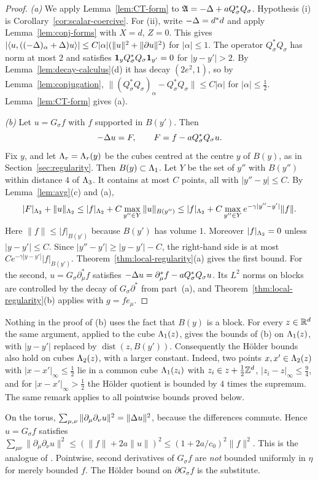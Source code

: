 \begin{proof}
\emph{(a)} We apply Lemma~\ref{lem:CT-form} to $\mathfrak A=-\Delta+aQ_\sigma^*Q_\sigma$. Hypothesis (i) is Corollary~\ref{cor:scalar-coercive}. For (ii), write $-\Delta=d^*d$ and apply Lemma~\ref{lem:conj-forms} with $X=d$, $Z=0$. This gives $|\langle u,((-\Delta)_\alpha+\Delta)u\rangle|\le C|\alpha|(\|u\|^2+\|\partial u\|^2)$ for $|\alpha|\le1$. The operator $Q_\sigma^*Q_\sigma$ has norm at most $2$ and satisfies $\mathbf 1_yQ_\sigma^*Q_\sigma\mathbf 1_{y'}=0$ for $|y-y'|>2$. By Lemma~\ref{lem:decay-calculus}(d) it has decay $(2e^2,1)$, so by Lemma~\ref{lem:conjugation}, $\|(Q_\sigma^*Q_\sigma)_\alpha-Q_\sigma^*Q_\sigma\|\le C|\alpha|$ for $|\alpha|\le\frac12$. Lemma~\ref{lem:CT-form} gives (a).

\emph{(b)} Let $u=G_\sigma f$ with $f$ supported in $B(y')$. Then
\[
-\Delta u=F,\qquad F=f-aQ_\sigma^*Q_\sigma u .
\]
Fix $y$, and let $\Lambda_r=\Lambda_r(y)$ be the cubes centred at the centre $y$ of $B(y)$, as in Section~\ref{sec:regularity}. Then $B(y)\subset\Lambda_1$. Let $Y$ be the set of $y''$ with $B(y'')$ within distance $4$ of $\Lambda_3$. It contains at most $C$ points, all with $|y''-y|\le C$. By Lemma~\ref{lem:avg}(c) and (a),
\[
|F|_{\Lambda_2}+\|u\|_{\Lambda_2}\le|f|_{\Lambda_2}+C\max_{y''\in Y}\|u\|_{B(y'')}\le|f|_{\Lambda_2}+C\max_{y''\in Y}e^{-\gamma|y''-y'|}\|f\|.
\]
Here $\|f\|\le|f|_{B(y')}$ because $B(y')$ has volume $1$. Moreover $|f|_{\Lambda_2}=0$ unless $|y-y'|\le C$. Since $|y''-y'|\ge|y-y'|-C$, the right-hand side is at most $Ce^{-\gamma|y-y'|}|f|_{B(y')}$. Theorem~\ref{thm:local-regularity}(a) gives the first bound. For the second, $u=G_\sigma\partial^*_\mu f$ satisfies $-\Delta u=\partial^*_\mu f-aQ_\sigma^*Q_\sigma u$. Its $L^2$ norms on blocks are controlled by the decay of $G_\sigma\partial^*$ from part~(a), and Theorem~\ref{thm:local-regularity}(b) applies with $g=fe_\mu$.
\end{proof}

\begin{remark}\label{rem:cubes}
Nothing in the proof of (b) uses the fact that $B(y)$ is a block. For every $z\in\mathbb R^d$ the same argument, applied to the cube $\Lambda_1(z)$, gives the bounds of (b) on $\Lambda_1(z)$, with $|y-y'|$ replaced by $\operatorname{dist}(z,B(y'))$. Consequently the H\"older bounds also hold on cubes $\Lambda_2(z)$, with a larger constant. Indeed, two points $x,x'\in\Lambda_2(z)$ with $|x-x'|_\infty\le\frac12$ lie in a common cube $\Lambda_1(z_i)$ with $z_i\in z+\frac12\mathbb Z^d$, $|z_i-z|_\infty\le\frac94$, and for $|x-x'|_\infty>\frac12$ the H\"older quotient is bounded by $4$ times the supremum. The same remark applies to all pointwise bounds proved below.
\end{remark}

\begin{remark}[$L^2$ regularity]\label{x:7.3}
On the torus, $\sum_{\mu,\nu}\|\partial_\mu\partial_\nu u\|^2=\|\Delta u\|^2$, because the differences commute. Hence $u=G_\sigma f$ satisfies $\sum_{\mu\nu}\|\partial_\mu\partial_\nu u\|^2\le(\|f\|+2a\|u\|)^2\le(1+2a/c_0)^2\|f\|^2$. This is the analogue of \cite[Prop.~1.1]{BalPropI}. Pointwise, second derivatives of $G_\sigma f$ are \emph{not} bounded uniformly in $\eta$ for merely bounded $f$. The H\"older bound on $\partial G_\sigma f$ is the substitute.
\end{remark}
